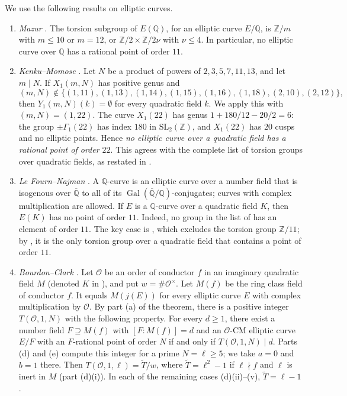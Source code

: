 \documentclass[11pt]{article}
\theoremstyle{remark}
\newcommand{\Q}{\mathbb Q}
\newcommand{\Z}{\mathbb Z}
\DeclareMathOperator{\Gal}{Gal}
\begin{document}
We use the following results on elliptic curves.
\begin{enumerate}
\item[(a)] \emph{Mazur} \cite[Theorem~(8)]{Mazur}. The torsion
subgroup of \(E(\Q)\), for an elliptic curve \(E/\Q\), is
\(\Z/m\) with \(m\leq10\) or \(m=12\), or \(\Z/2\times\Z/2\nu\) with
\(\nu\leq4\). In particular, no elliptic curve over \(\Q\) has a
rational point of order \(11\).

\item[(b)] \emph{Kenku--Momose} \cite[Theorem~(0.1)]{KM}. Let \(N\) be
a product of powers of \(2,3,5,7,11,13\), and let \(m\mid N\). If
\(X_1(m,N)\) has positive genus and
\[
 (m,N)\notin\{(1,11),(1,13),(1,14),(1,15),(1,16),(1,18),(2,10),(2,12)\},
\]
then \(Y_1(m,N)(k)=\emptyset\) for every quadratic field \(k\). We apply
this with \((m,N)=(1,22)\). The curve \(X_1(22)\) has genus
\(1+180/12-20/2=6\): the group \(\pm\Gamma_1(22)\) has index \(180\)
in \(\mathrm{SL}_2(\Z)\), and \(X_1(22)\) has \(20\) cusps and no
elliptic points. Hence \emph{no elliptic curve over a quadratic field
has a rational point of order \(22\)}. This agrees with the complete
list of torsion groups over quadratic fields, as restated in
\cite[Theorem~2.1]{LFN}.

\item[(c)] \emph{Le Fourn--Najman} \cite[Theorem~1.1]{LFN}. A
\(\Q\)-curve is an elliptic curve over a number field that is
isogenous over \(\overline{\Q}\) to all of its
\(\Gal(\overline{\Q}/\Q)\)-conjugates; curves with complex
multiplication are allowed. If \(E\) is a \(\Q\)-curve over a
quadratic field \(K\), then \(E(K)\) has no point of order \(11\).
Indeed, no group in the list of \cite[Theorem~1.1]{LFN} has an element
of order \(11\). The key case is \cite[Proposition~3.2]{LFN}, which
excludes the torsion group \(\Z/11\); by \cite[Theorem~2.1]{LFN}, it is
the only torsion group over a quadratic field that contains a point of
order \(11\).

\item[(d)] \emph{Bourdon--Clark} \cite[Theorem~4.1]{BC}. Let
\(\mathcal O\) be an order of conductor \(f\) in an imaginary quadratic
field \(M\) (denoted \(K\) in \cite{BC}), and put \(w=\#\mathcal O^\times\). Let \(M(f)\) be the ring
class field of conductor \(f\). It equals \(M(j(E))\) for every elliptic
curve \(E\) with complex multiplication by \(\mathcal O\). By part (a)
of the theorem, there is a positive integer \(T(\mathcal O,1,N)\) with
the following property. For every \(d\geq1\), there exist a number field
\(F\supseteq M(f)\) with \([F:M(f)]=d\) and an
\(\mathcal O\)-CM elliptic curve \(E/F\) with an \(F\)-rational point
of order \(N\) if and only if \(T(\mathcal O,1,N)\mid d\). Parts (d)
and (e) compute this integer for a prime \(N=\ell\geq5\); we take
\(a=0\) and \(b=1\) there. Then
\(T(\mathcal O,1,\ell)=\widetilde T/w\), where
\(\widetilde T=\ell^2-1\) if \(\ell\nmid f\) and \(\ell\) is inert in
\(M\) (part (d)(i)). In each of the remaining cases (d)(ii)--(v),
\(\widetilde T=\ell-1\).


\end{enumerate}
\end{document}
